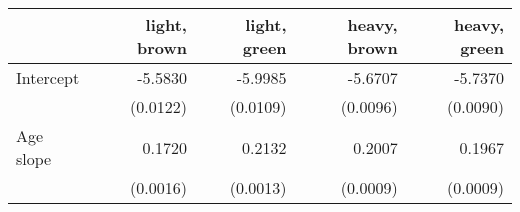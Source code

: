 \begin{tabular}{lrrrr} 
\toprule 
                                & light, brown   & light, green   & heavy, brown   & heavy, green  \\ 
\midrule 
                     Intercept  &      -5.5830   &      -5.9985   &      -5.6707   &      -5.7370  \\ 
                                & (0.0122)   & (0.0109)   & (0.0096)   & (0.0090)  \\ 
                     Age slope  &       0.1720   &       0.2132   &       0.2007   &       0.1967  \\ 
                                & (0.0016)   & (0.0013)   & (0.0009)   & (0.0009)  \\ 
\bottomrule \end{tabular} 
